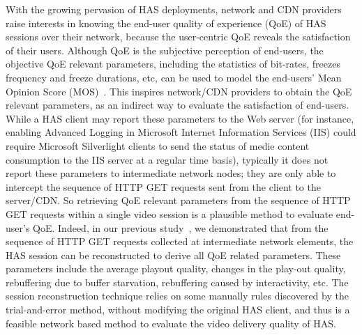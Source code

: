 \documentclass[journal]{IEEEtran}
\begin{document}
With the growing pervasion of HAS deployments, network and CDN providers raise interests in knowing the end-user quality of experience (QoE) of HAS sessions over their network, because the user-centric QoE reveals the satisfaction of their users. Although QoE is the subjective perception of end-users, the objective QoE relevant parameters, including the statistics of bit-rates, freezes frequency and freeze durations, etc, can be used to model the end-users' Mean Opinion Score (MOS)~\cite{de2013model}. This inspires network/CDN providers to obtain the QoE relevant parameters, as an indirect way to evaluate the satisfaction of end-users. While a HAS client may report these parameters to the Web server (for instance, enabling Advanced Logging in Microsoft Internet Information Services (IIS) could require Microsoft Silverlight clients to send the status of medie content consumption to the IIS server at a regular time basis), typically it does not report these parameters to intermediate network nodes; they are only able to intercept the sequence of HTTP GET requests sent from the client to the server/CDN. So retrieving QoE relevant parameters from the sequence of HTTP GET requests within a single video session is a plausible method to evaluate end-user's QoE. 
Indeed, in our previous study~\cite{huysegems2012session}, we demonstrated that from the sequence of HTTP GET requests collected at intermediate network elements, the HAS session can be reconstructed to derive all QoE related parameters. These parameters include the average playout quality, changes in the play-out quality, rebuffering due to buffer starvation, rebuffering caused by interactivity, etc. The session reconstruction technique relies on some manually rules discovered by the trial-and-error method, without modifying the original HAS client, and thus is a feasible network based method to evaluate the video delivery quality of HAS.
\end{document}
